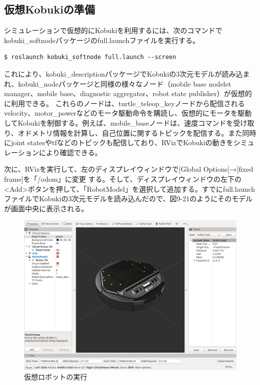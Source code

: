 \begin{itemize}
\subsection{仮想Kobukiの準備}

シミュレーションで仮想的にKobukiを利用するには、次のコマンドでkobuki\_softnodeパッケージのfull.launchファイルを実行する。

\begin{lstlisting}[language=ROS]
$ roslaunch kobuki_softnode full.launch --screen
\end{lstlisting}

これにより、kobuki\_descriptionパッケージでKobukiの3次元モデルが読み込まれ、kobuki\_nodeパッケージと同様の様々なノード（mobile base nodelet manager、mobile base、diagnostic aggregator、robot state publisher）が仮想的に利用できる。
これらのノードは、turtle\_teleop\_keyノードから配信されるvelocity、motor\_powerなどのモータ駆動命令を購読し、仮想的にモータを駆動してKobukiを制御する。例えば、mobile\_baseノードは、速度コマンドを受け取り、オドメトリ情報を計算し、自己位置に関するトピックを配信する。また同時
にjoint statesやtfなどのトピックも配信しており、RVizでKobukiの動きをシミュレーションにより確認できる。

次に、RVizを実行して、左のディスプレイウィンドウで[Global Options]→[fixed frame]を「/odom」に変更  する。そして、ディスプレイウィンドウの左下の<Add>ボタンを押して、「RobotModel」を選択して追加する。すでにfull.launchファイルでKobukiの3次元モデルを読み込んだので、図9-21のようにそのモデルが画面中央に表示される。

\begin{figure}[ht]
  \centering
  \includegraphics[width=\columnwidth]{pictures/chapter9/pic_09_21.png}
  \caption{仮想ロボットの実行}
\end{figure}


\end{itemize}
